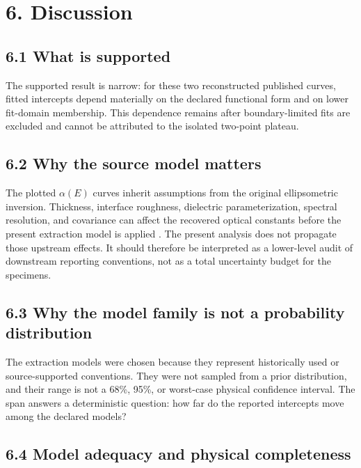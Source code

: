 \section{6. Discussion}\label{discussion}

\subsection{6.1 What is supported}\label{what-is-supported}

The supported result is narrow: for these two reconstructed published
curves, fitted intercepts depend materially on the declared functional
form and on lower fit-domain membership. This dependence remains after
boundary-limited fits are excluded and cannot be attributed to the
isolated two-point plateau.

\subsection{6.2 Why the source model
matters}\label{why-the-source-model-matters}

The plotted \(\alpha(E)\) curves inherit assumptions from the original
ellipsometric inversion. Thickness, interface roughness, dielectric
parameterization, spectral resolution, and covariance can affect the
recovered optical constants before the present extraction model is
applied \citep{Ibrahim1971, BuAbbud1981, GarciaCaurel2013}. The present
analysis does not propagate those upstream effects. It should therefore
be interpreted as a lower-level audit of downstream reporting
conventions, not as a total uncertainty budget for the specimens.

\subsection{6.3 Why the model family is not a probability
distribution}\label{why-the-model-family-is-not-a-probability-distribution}

The extraction models were chosen because they represent historically
used or source-supported conventions. They were not sampled from a prior
distribution, and their range is not a 68\%, 95\%, or worst-case
physical confidence interval. The span answers a deterministic question:
how far do the reported intercepts move among the declared models?

\subsection{6.4 Model adequacy and physical
completeness}\label{model-adequacy-and-physical-completeness}

